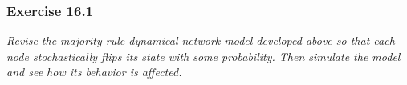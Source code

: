 
\subsubsection*{Exercise 16.1}

\textit{Revise the majority rule dynamical network model developed above so
that each node stochastically flips its state with some probability. Then
simulate the model and see how its behavior is affected.}
